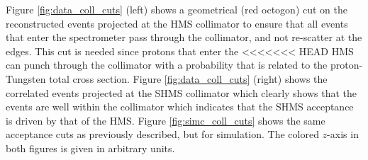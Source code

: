 \documentclass[aps, prl]{revtex4-2}  %
\begin{document}
\clearpage
\indent Figure \ref{fig:data_coll_cuts} (left) shows a geometrical (red octogon) cut on the reconstructed events projected at the HMS collimator to ensure
that all events that enter the spectrometer pass through the collimator, and not re-scatter at the edges. This cut is needed since protons that enter the
<<<<<<< HEAD
HMS can punch through the collimator with a probability that is related to the proton-Tungsten total cross section. Figure \ref{fig:data_coll_cuts} (right)
shows the correlated events projected at the SHMS collimator which clearly shows that the events are well within the collimator which indicates that the SHMS
acceptance is driven by that of the HMS. Figure \ref{fig:simc_coll_cuts} shows the same acceptance cuts as previously described, but for simulation. The colored
$z$-axis in both figures is given in arbitrary units.\\
\end{document}

